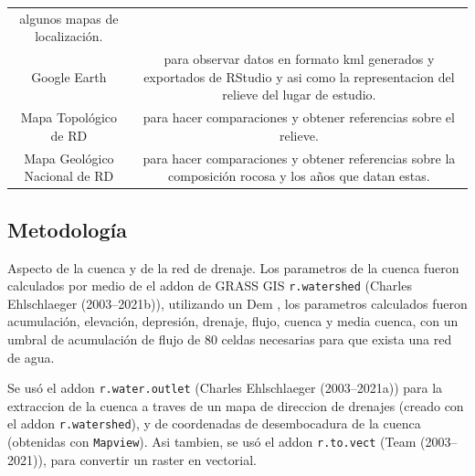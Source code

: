 \documentclass[11pt,]{article}
\begin{document}
\begin{longtable}[]{@{}cc@{}}
\begin{minipage}[t]{0.83\columnwidth}
algunos mapas de localización.\strut
\end{minipage}\tabularnewline
\begin{minipage}[t]{0.11\columnwidth}\centering\strut
Google Earth\strut
\end{minipage} & \begin{minipage}[t]{0.83\columnwidth}\centering\strut
para observar datos en formato kml generados y exportados de RStudio y
asi como la representacion del relieve del lugar de estudio.\strut
\end{minipage}\tabularnewline
\begin{minipage}[t]{0.11\columnwidth}\centering\strut
Mapa Topológico de RD\strut
\end{minipage} & \begin{minipage}[t]{0.83\columnwidth}\centering\strut
para hacer comparaciones y obtener referencias sobre el relieve.\strut
\end{minipage}\tabularnewline
\begin{minipage}[t]{0.11\columnwidth}\centering\strut
Mapa Geológico Nacional de RD\strut
\end{minipage} & \begin{minipage}[t]{0.83\columnwidth}\centering\strut
para hacer comparaciones y obtener referencias sobre la composición
rocosa y los años que datan estas.\strut
\end{minipage}\tabularnewline
\bottomrule
\end{longtable}

\subsection{Metodología}\label{metodologuxeda}

Aspecto de la cuenca y de la red de drenaje. Los parametros de la cuenca
fueron calculados por medio de el addon de GRASS GIS
\texttt{r.watershed} (Charles Ehlschlaeger (2003--2021b)), utilizando un
Dem , los parametros calculados fueron acumulación, elevación,
depresión, drenaje, flujo, cuenca y media cuenca, con un umbral de
acumulación de flujo de 80 celdas necesarias para que exista una red de
agua.

Se usó el addon \texttt{r.water.outlet} (Charles Ehlschlaeger
(2003--2021a)) para la extraccion de la cuenca a traves de un mapa de
direccion de drenajes (creado con el addon \texttt{r.watershed}), y de
coordenadas de desembocadura de la cuenca (obtenidas con
\texttt{Mapview}). Asi tambien, se usó el addon \texttt{r.to.vect} (Team
(2003--2021)), para convertir un raster en vectorial.
\end{document}
